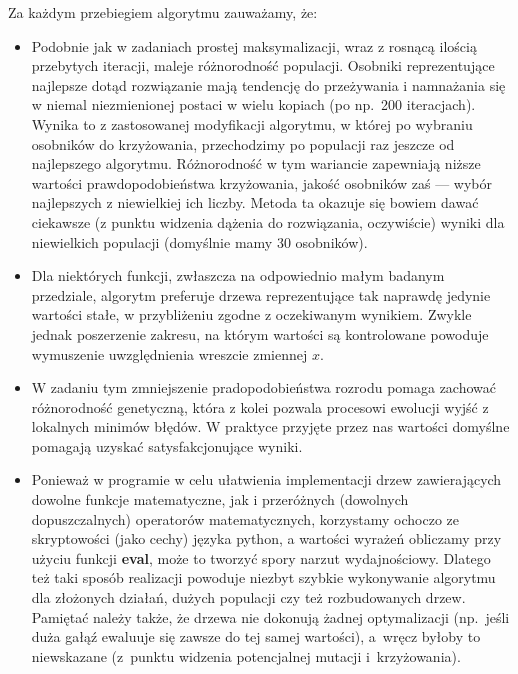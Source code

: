 \documentclass{classrep2}
\begin{document}
Za każdym przebiegiem algorytmu zauważamy, że:
\begin{itemize}
  \item Podobnie jak w zadaniach prostej maksymalizacji, wraz z rosnącą ilością przebytych iteracji, maleje różnorodność populacji. Osobniki reprezentujące najlepsze dotąd rozwiązanie mają tendencję do przeżywania i namnażania się w niemal niezmienionej postaci w wielu kopiach (po np.~200 iteracjach). Wynika to z zastosowanej modyfikacji algorytmu, w której po wybraniu osobników do krzyżowania, przechodzimy po populacji raz jeszcze od najlepszego algorytmu. Różnorodność w tym wariancie zapewniają niższe wartości prawdopodobieństwa krzyżowania, jakość osobników zaś --- wybór najlepszych z niewielkiej ich liczby. Metoda ta okazuje się bowiem dawać ciekawsze (z punktu widzenia dążenia do rozwiązania, oczywiście) wyniki dla niewielkich populacji (domyślnie mamy 30 osobników).
  \item Dla niektórych funkcji, zwłaszcza na odpowiednio małym badanym przedziale, algorytm preferuje drzewa reprezentujące tak naprawdę jedynie wartości stałe, w przybliżeniu zgodne z oczekiwanym wynikiem. Zwykle jednak poszerzenie zakresu, na którym wartości są kontrolowane powoduje wymuszenie uwzględnienia wreszcie zmiennej $x$.
  \item W zadaniu tym zmniejszenie pradopodobieństwa rozrodu pomaga zachować różnorodność genetyczną, która z kolei pozwala procesowi ewolucji wyjść z lokalnych minimów błędów. W praktyce przyjęte przez nas wartości domyślne pomagają uzyskać satysfakcjonujące wyniki.
  \item Ponieważ w programie w celu ułatwienia implementacji drzew zawierających dowolne funkcje matematyczne, jak i przeróżnych (dowolnych dopuszczalnych) operatorów matematycznych, korzystamy ochoczo ze skryptowości (jako cechy) języka python, a wartości wyrażeń obliczamy przy użyciu funkcji \textbf{eval}, może to tworzyć spory narzut wydajnościowy. Dlatego też taki sposób realizacji powoduje niezbyt szybkie wykonywanie algorytmu dla złożonych działań, dużych populacji czy też rozbudowanych drzew. Pamiętać należy także, że drzewa nie dokonują żadnej optymalizacji (np.~jeśli duża gałąź ewaluuje się zawsze do tej samej wartości), a~wręcz byłoby to niewskazane (z~punktu widzenia potencjalnej mutacji i~krzyżowania).
\end{itemize}
\end{document}
